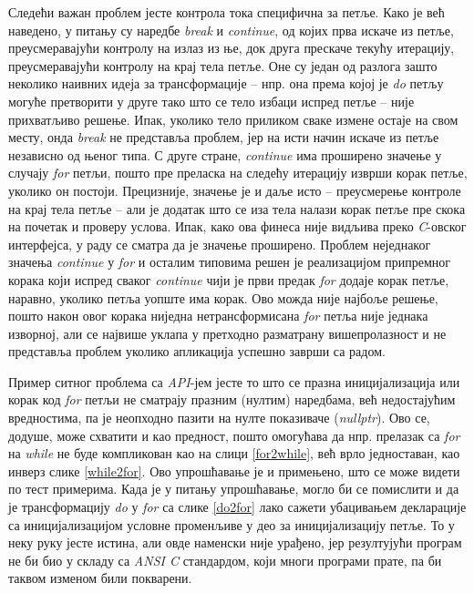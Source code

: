 \documentclass[a4paper]{article}
\begin{document}
Следећи важан проблем јесте контрола тока специфична за петље. Како је већ наведено, у питању су наредбе \textit{break} и \textit{continue}, од којих прва искаче из петље, преусмеравајући контролу на излаз из ње, док друга прескаче текућу итерацију, преусмеравајући контролу на крај тела петље. Оне су један од разлога зашто неколико наивних идеја за трансформације -- нпр. она према којој је \textit{do} петљу могуће претворити у друге тако што се тело избаци испред петље -- није прихватљиво решење. Ипак, уколико тело приликом сваке измене остаје на свом месту, онда \textit{break} не представља проблем, јер на исти начин искаче из петље независно од њеног типа. С друге стране, \textit{continue} има проширено значење у случају \textit{for} петљи, пошто пре преласка на следећу итерацију изврши корак петље, уколико он постоји. Прецизније, значење је и даље исто -- преусмерење контроле на крај тела петље -- али је додатак што се иза тела налази корак петље пре скока на почетак и проверу услова. Ипак, како ова финеса није видљива преко \textit{C}-овског интерфејса, у раду се сматра да је значење проширено. Проблем неједнаког значења \textit{continue} у \textit{for} и осталим типовима решен је реализацијом припремног корака који испред сваког \textit{continue} чији је први предак \textit{for} додаје корак петље, наравно, уколико петља уопште има корак. Ово можда није најбоље решење, пошто након овог корака ниједна нетрансформисана \textit{for} петља није једнака изворној, али се највише уклапа у претходно разматрану вишепролазност и не представља проблем уколико апликација успешно заврши са радом.

Пример ситног проблема са \textit{API}-јем јесте то што се празна иницијализација или корак код \textit{for} петљи не сматрају празним (нултим) наредбама, већ недостајућим вредностима, па је неопходно пазити на нулте показиваче (\textit{nullptr}). Ово се, додуше, може схватити и као предност, пошто омогућава да нпр. прелазак са \textit{for} на \textit{while} не буде компликован као на слици \ref{for2while}, већ врло једноставан, као инверз слике \ref{while2for}. Ово упрошћавање је и примењено, што се може видети по тест примерима. Када је у питању упрошћавање, могло би се помислити и да је трансформацију \textit{do} у \textit{for} са слике \ref{do2for} лако сажети убацивањем декларације са иницијализацијом условне променљиве у део за иницијализацију петље. То у неку руку јесте истина, али овде наменски није урађено, јер резултујући програм не би био у складу са \textit{ANSI C} стандардом, који многи програми прате, па би таквом изменом били покварени.
\end{document}
